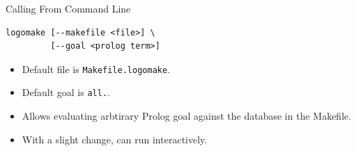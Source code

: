 \documentclass[presentation]{beamer}
\begin{document}
\begin{frame}[fragile,label=sec-4-4]{Calling From Command Line}
 \begin{verbatim}
logomake [--makefile <file>] \
         [--goal <prolog term>]
\end{verbatim}

\begin{itemize}
\item Default file is \texttt{Makefile.logomake}.
\item Default goal is \texttt{all.}.
\item Allows evaluating arbtirary Prolog goal against the database in
the Makefile.
\item With a slight change, can run interactively.
\end{itemize}
\end{frame}
\end{document}
